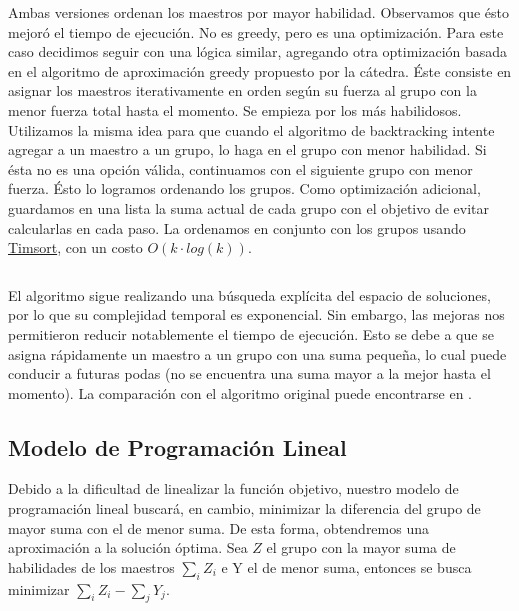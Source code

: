 \documentclass{article}
\begin{document}
Ambas versiones ordenan los maestros por mayor habilidad. Observamos que ésto mejoró el tiempo de ejecución. No es greedy, pero es una optimización. Para este caso decidimos seguir con una lógica similar, agregando otra optimización basada en el algoritmo de aproximación greedy propuesto por la cátedra. Éste consiste en asignar los maestros iterativamente en orden según su fuerza al grupo con la menor fuerza total hasta el momento. Se empieza por los más habilidosos. Utilizamos la misma idea para que cuando el algoritmo de backtracking intente agregar a un maestro a un grupo, lo haga en el grupo con menor habilidad. Si ésta no es una opción válida, continuamos con el siguiente grupo con menor fuerza. Ésto lo logramos ordenando los grupos. Como optimización adicional, guardamos en una lista la suma actual de cada grupo con el objetivo de evitar calcularlas en cada paso. La ordenamos en conjunto con los grupos usando \href{https://svn.python.org/projects/python/trunk/Objects/listsort.txt}{Timsort}, con un costo $O(k \cdot log(k))$.  

\inputminted[linenos, firstline=29, lastline=64]{python}{codigo/backtracking_con_greedy.py}

El algoritmo sigue realizando una búsqueda explícita del espacio de soluciones, por lo que su complejidad temporal es exponencial. Sin embargo, las mejoras nos permitieron reducir notablemente el tiempo de ejecución. Esto se debe a que se asigna rápidamente un maestro a un grupo con una suma pequeña, lo cual puede conducir a futuras podas (no se encuentra una suma mayor a la mejor hasta el momento). La comparación con el algoritmo original puede encontrarse en . 
\subsection{Modelo de Programación Lineal}

Debido a la dificultad de linealizar la función objetivo, nuestro modelo de programación lineal buscará, en cambio, minimizar la diferencia del grupo de mayor suma con el de menor suma. De esta forma, obtendremos una aproximación a la solución óptima. Sea $Z$ el grupo con la mayor suma de habilidades de los maestros \(\sum_{i} Z_i\) e Y el de menor suma, entonces se busca minimizar \(\sum_{i} Z_i - \sum_{j} Y_j\).
\end{document}
